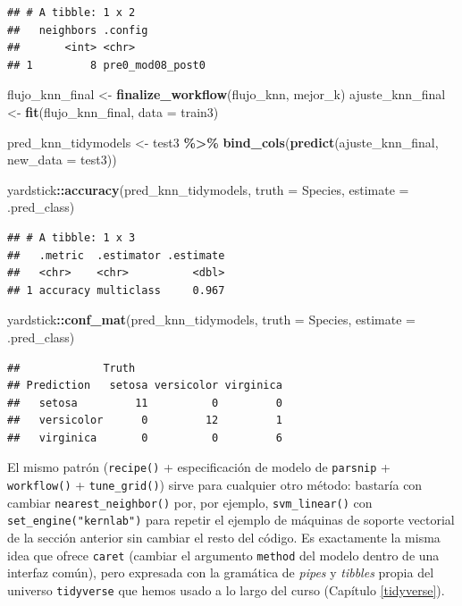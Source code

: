 \documentclass[
]{book}
\newenvironment{Shaded}{\begin{snugshade}}{\end{snugshade}}
\newcommand{\AttributeTok}[1]{\textcolor[rgb]{0.13,0.29,0.53}{#1}}
\newcommand{\FunctionTok}[1]{\textcolor[rgb]{0.13,0.29,0.53}{\textbf{#1}}}
\newcommand{\NormalTok}[1]{#1}
\newcommand{\OtherTok}[1]{\textcolor[rgb]{0.56,0.35,0.01}{#1}}
\newcommand{\SpecialCharTok}[1]{\textcolor[rgb]{0.81,0.36,0.00}{\textbf{#1}}}
\theoremstyle{break}
\theoremstyle{nonumberplain}
\begin{document}
\begin{verbatim}
## # A tibble: 1 x 2
##   neighbors .config         
##       <int> <chr>           
## 1         8 pre0_mod08_post0
\end{verbatim}

\begin{Shaded}
\begin{Highlighting}[]
\NormalTok{flujo\_knn\_final }\OtherTok{\textless{}{-}} \FunctionTok{finalize\_workflow}\NormalTok{(flujo\_knn, mejor\_k)}
\NormalTok{ajuste\_knn\_final }\OtherTok{\textless{}{-}} \FunctionTok{fit}\NormalTok{(flujo\_knn\_final, }\AttributeTok{data =}\NormalTok{ train3)}

\NormalTok{pred\_knn\_tidymodels }\OtherTok{\textless{}{-}}\NormalTok{ test3 }\SpecialCharTok{\%\textgreater{}\%}
  \FunctionTok{bind\_cols}\NormalTok{(}\FunctionTok{predict}\NormalTok{(ajuste\_knn\_final, }\AttributeTok{new\_data =}\NormalTok{ test3))}

\NormalTok{yardstick}\SpecialCharTok{::}\FunctionTok{accuracy}\NormalTok{(pred\_knn\_tidymodels, }\AttributeTok{truth =}\NormalTok{ Species,}
                     \AttributeTok{estimate =}\NormalTok{ .pred\_class)}
\end{Highlighting}
\end{Shaded}

\begin{verbatim}
## # A tibble: 1 x 3
##   .metric  .estimator .estimate
##   <chr>    <chr>          <dbl>
## 1 accuracy multiclass     0.967
\end{verbatim}

\begin{Shaded}
\begin{Highlighting}[]
\NormalTok{yardstick}\SpecialCharTok{::}\FunctionTok{conf\_mat}\NormalTok{(pred\_knn\_tidymodels, }\AttributeTok{truth =}\NormalTok{ Species,}
                     \AttributeTok{estimate =}\NormalTok{ .pred\_class)}
\end{Highlighting}
\end{Shaded}

\begin{verbatim}
##             Truth
## Prediction   setosa versicolor virginica
##   setosa         11          0         0
##   versicolor      0         12         1
##   virginica       0          0         6
\end{verbatim}

El mismo patrón (\texttt{recipe()} + especificación de modelo de \texttt{parsnip} + \texttt{workflow()} + \texttt{tune\_grid()}) sirve para cualquier otro método: bastaría con cambiar \texttt{nearest\_neighbor()} por, por ejemplo, \texttt{svm\_linear()} con \texttt{set\_engine("kernlab")} para repetir el ejemplo de máquinas de soporte vectorial de la sección anterior sin cambiar el resto del código. Es exactamente la misma idea que ofrece \texttt{caret} (cambiar el argumento \texttt{method} del modelo dentro de una interfaz común), pero expresada con la gramática de \emph{pipes} y \emph{tibbles} propia del universo \texttt{tidyverse} que hemos usado a lo largo del curso (Capítulo \ref{tidyverse}).
\end{document}
